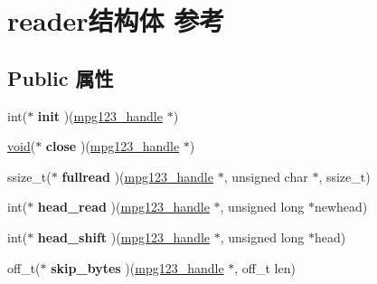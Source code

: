 \hypertarget{structreader}{}\section{reader结构体 参考}
\label{structreader}
\subsection*{Public 属性}
\begin{DoxyCompactItemize}
\item 
\mbox{\label{structreader_a7c9bd94ea3b39a5853f9cd9dc157203a}} 
int($\ast$ {\bfseries init} )(\hyperlink{group__mpg123__init_ga6728e2839a395f3a07d4514da659faca}{mpg123\+\_\+handle} $\ast$)
\item 
\mbox{\label{structreader_a9ce682fad7b2dd60e20e9a26dc936707}} 
\hyperlink{interfacevoid}{void}($\ast$ {\bfseries close} )(\hyperlink{group__mpg123__init_ga6728e2839a395f3a07d4514da659faca}{mpg123\+\_\+handle} $\ast$)
\item 
\mbox{\label{structreader_a9cf7be69d1be6a715e4210f0ed864fae}} 
ssize\+\_\+t($\ast$ {\bfseries fullread} )(\hyperlink{group__mpg123__init_ga6728e2839a395f3a07d4514da659faca}{mpg123\+\_\+handle} $\ast$, unsigned char $\ast$, ssize\+\_\+t)
\item 
\mbox{\label{structreader_af56b913c01bf5b2c0262874ce5993e4d}} 
int($\ast$ {\bfseries head\+\_\+read} )(\hyperlink{group__mpg123__init_ga6728e2839a395f3a07d4514da659faca}{mpg123\+\_\+handle} $\ast$, unsigned long $\ast$newhead)
\item 
\mbox{\label{structreader_a1ac3848a1811aef88df401bb5af45756}} 
int($\ast$ {\bfseries head\+\_\+shift} )(\hyperlink{group__mpg123__init_ga6728e2839a395f3a07d4514da659faca}{mpg123\+\_\+handle} $\ast$, unsigned long $\ast$head)
\item 
\mbox{\label{structreader_a67efb06b754c2ab5e839182377d1fce4}} 
off\+\_\+t($\ast$ {\bfseries skip\+\_\+bytes} )(\hyperlink{group__mpg123__init_ga6728e2839a395f3a07d4514da659faca}{mpg123\+\_\+handle} $\ast$, off\+\_\+t len)
\item 
\mbox{\label{structreader_aba6997cd286c7302ae7da274dcd5182e}} 

\end{DoxyCompactItemize}
